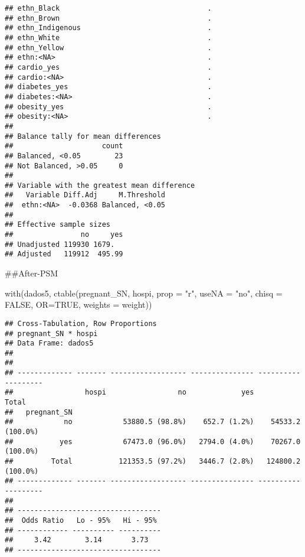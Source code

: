 \documentclass[
]{article}
\newenvironment{Shaded}{\begin{snugshade}}{\end{snugshade}}
\newcommand{\AttributeTok}[1]{\textcolor[rgb]{0.77,0.63,0.00}{#1}}
\newcommand{\ConstantTok}[1]{\textcolor[rgb]{0.00,0.00,0.00}{#1}}
\newcommand{\FunctionTok}[1]{\textcolor[rgb]{0.00,0.00,0.00}{#1}}
\newcommand{\NormalTok}[1]{#1}
\newcommand{\OtherTok}[1]{\textcolor[rgb]{0.56,0.35,0.01}{#1}}
\newcommand{\SpecialCharTok}[1]{\textcolor[rgb]{0.00,0.00,0.00}{#1}}
\newcommand{\StringTok}[1]{\textcolor[rgb]{0.31,0.60,0.02}{#1}}
\begin{document}
\begin{verbatim}
## ethn_Black                                   .
## ethn_Brown                                   .
## ethn_Indigenous                              .
## ethn_White                                   .
## ethn_Yellow                                  .
## ethn:<NA>                                    .
## cardio_yes                                   .
## cardio:<NA>                                  .
## diabetes_yes                                 .
## diabetes:<NA>                                .
## obesity_yes                                  .
## obesity:<NA>                                 .
## 
## Balance tally for mean differences
##                     count
## Balanced, <0.05        23
## Not Balanced, >0.05     0
## 
## Variable with the greatest mean difference
##   Variable Diff.Adj     M.Threshold
##  ethn:<NA>  -0.0368 Balanced, <0.05
## 
## Effective sample sizes
##                no     yes
## Unadjusted 119930 1679.  
## Adjusted   119912  495.99
\end{verbatim}

\begin{Shaded}
\end{Shaded}

\#\#After-PSM

\begin{Shaded}
\begin{Highlighting}[]
\FunctionTok{with}\NormalTok{(dados5, }\FunctionTok{ctable}\NormalTok{(pregnant\_SN, hospi, }\AttributeTok{prop =} \StringTok{"r"}\NormalTok{, }\AttributeTok{useNA =} \StringTok{"no"}\NormalTok{, }
                    \AttributeTok{chisq =} \ConstantTok{FALSE}\NormalTok{, }\AttributeTok{OR=}\ConstantTok{TRUE}\NormalTok{, }\AttributeTok{weights =}\NormalTok{ weight))}
\end{Highlighting}
\end{Shaded}

\begin{verbatim}
## Cross-Tabulation, Row Proportions  
## pregnant_SN * hospi  
## Data Frame: dados5  
## 
## 
## ------------- ------- ------------------ --------------- -------------------
##                 hospi                 no             yes               Total
##   pregnant_SN                                                               
##            no            53880.5 (98.8%)    652.7 (1.2%)    54533.2 (100.0%)
##           yes            67473.0 (96.0%)   2794.0 (4.0%)    70267.0 (100.0%)
##         Total           121353.5 (97.2%)   3446.7 (2.8%)   124800.2 (100.0%)
## ------------- ------- ------------------ --------------- -------------------
## 
## ----------------------------------
##  Odds Ratio   Lo - 95%   Hi - 95% 
## ------------ ---------- ----------
##     3.42        3.14       3.73   
## ----------------------------------
\end{verbatim}
\end{document}
